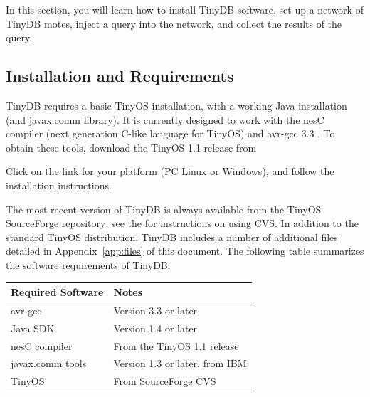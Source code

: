 \documentclass[11pt]{article}
\begin{document}
In this section, you will learn how to install TinyDB software, set up a network of TinyDB motes, inject a query
into the network, and collect the results of the query.  

\subsection{Installation and Requirements}
TinyDB requires a basic TinyOS installation, with a working Java
installation (and javax.comm library).  
It is currently designed to work with the nesC compiler (next generation C-like language for TinyOS) 
and avr-gcc 3.3 .  To obtain these tools, download the 
TinyOS 1.1 release from 


Click on the link for your platform (PC Linux or Windows), and
follow the installation instructions.

The most recent version of TinyDB is always available from the TinyOS SourceForge
repository;
see the
for instructions on using CVS.
In addition to the standard TinyOS distribution, TinyDB includes a number of
additional files detailed in Appendix~\ref{app:files} of this document. The following table summarizes the software requirements of TinyDB: 

\par
\tiny
\begin{tabular}{|l|l|}
\hline
Required Software & Notes \\
\hline\hline
avr-gcc \index{avr-gcc}\index{gcc} & Version 3.3 or later \\ 
Java SDK \index{Java} & Version 1.4 or later \\
nesC compiler \index{nesC} & From the TinyOS 1.1 release \\
javax.comm tools & Version 1.3 or later, from IBM \\
TinyOS & From SourceForge CVS \\
\hline
\end{tabular}
\normalsize
\\
\end{document}
